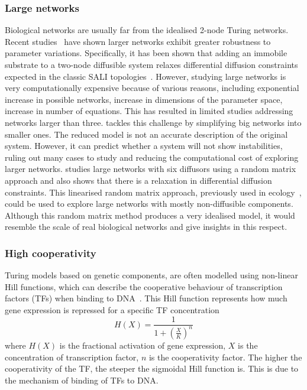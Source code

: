 \subsubsection{Large networks}
Biological networks are usually far from the idealised 2-node Turing networks. %
Recent studies~\parencite{Zheng2016, Scholes2019, Marcon} have shown larger networks exhibit greater robustness to parameter variations.
Specifically, it has been shown that adding an immobile substrate to a two-node diffusible system relaxes differential diffusion constraints expected in the classic SALI topologies~\parencite{korvasova2015}.
However, studying large networks is very computationally expensive because of various reasons, including exponential increase in possible networks, increase in dimensions of the parameter space, increase in number of equations.
This has resulted in limited studies addressing networks larger than three.
\cite{Smith2018a} tackles this challenge by simplifying big networks into smaller ones.
The reduced model is not an accurate description of the original system.
However, it can predict whether a system will not show instabilities, ruling out many cases to study and reducing the computational cost of exploring larger networks.
\cite{Haas2021} studies large networks with six diffusors using a random matrix approach and also shows that there is a relaxation in differential diffusion constraints.
This linearised random matrix approach, previously used in ecology~\parencite{May1972}, could be used to explore large networks with mostly non-diffusible components.
Although this random matrix method produces a very idealised model, it would resemble the scale of real biological networks and give insights in this respect.


\subsubsection{High cooperativity}
Turing models based on genetic components, are often modelled using non-linear Hill functions, which can describe the cooperative behaviour of transcription factors (TFs) when binding to DNA~\parencite{Morgunova2017}.
This Hill function represents how much gene expression is repressed for a specific TF concentration
\begin{equation}
    H(X) = \frac{1}{1+(\frac{X}{K})^n}
\end{equation}
where $H(X)$ is the fractional activation of gene expression, $X$ is the concentration of transcription factor, $n$ is the cooperativity factor.
The higher the cooperativity of the TF, the steeper the sigmoidal Hill function is.
This is due to the mechanism of binding of TFs to DNA.

